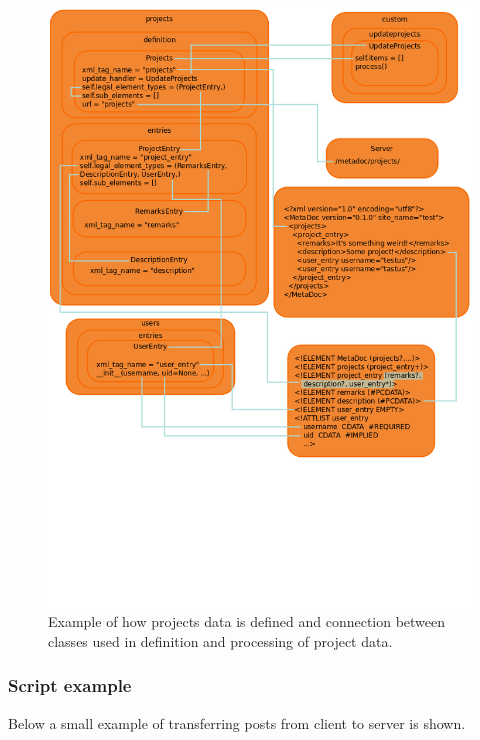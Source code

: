 \begin{figure}[h!]
    \includegraphics[width=\textwidth]{img/example}
    \caption{Example of how projects data is defined and connection between
    classes used in definition and processing of project data.}
    \label{fig:connection_example}
\end{figure}

\newpage
\subsubsection{Script example}
Below a small example of transferring posts from client to server is shown. 

